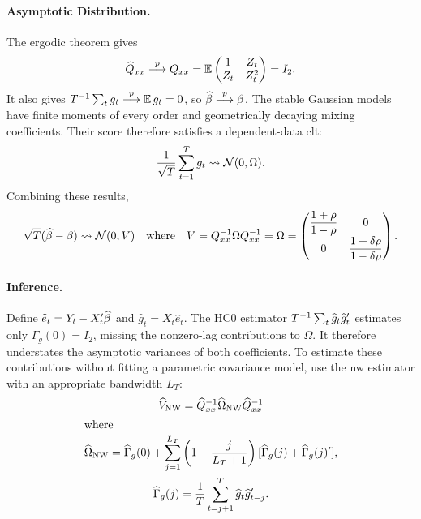\documentclass[a4paper,12pt]{article}
\begin{document}
\paragraph{Asymptotic Distribution.}
The ergodic theorem gives
\begin{align}
	\widehat Q_{xx}\overset{p}{\longrightarrow} Q_{xx}
	=\operatorname{\mathbb{E}}\begin{pmatrix}1&Z_t\\Z_t&Z_t^2\end{pmatrix}=I_2.
\end{align}
It also gives $T^{-1}\sum_tg_t\overset{p}{\longrightarrow}\operatorname{\mathbb{E}} g_t=0$, so $\widehat\beta\overset{p}{\longrightarrow}\beta$.
The stable Gaussian models have finite moments of every order and geometrically decaying mixing coefficients.
Their score therefore satisfies a dependent-data \gls{clt}:
\begin{align}
	\frac1{\sqrt T}\sum_{t=1}^T g_t\overset{}{\leadsto}\operatorname{\mathcal{N}}(0,\Omega).
\end{align}
Combining these results,
\begin{gather}
	\sqrt T(\widehat\beta-\beta)
	\overset{}{\leadsto}\operatorname{\mathcal{N}}(0,V)
	\quad\text{where}\quad
	V=Q_{xx}^{-1}\Omega Q_{xx}^{-1}=\Omega
	=\begin{pmatrix}
		\dfrac{1+\rho}{1-\rho}&0\\[6pt]
		0&\dfrac{1+\delta\rho}{1-\delta\rho}
	\end{pmatrix}.
\end{gather}

\paragraph{Inference.}
Define $\widehat e_t=Y_t-X_t^{\prime}\widehat\beta$ and $\widehat g_t=X_t\widehat e_t$.
The HC0 estimator $T^{-1}\sum_t\widehat g_t\widehat g_t^{\prime}$ estimates only $\Gamma_g(0)=I_2$,
missing the nonzero-lag contributions to $\Omega$.
It therefore understates the asymptotic variances of both coefficients.
To estimate these contributions without fitting a parametric covariance model,
use the \gls{nw} estimator with an appropriate bandwidth $L_T$:
\begin{gather}
	\widehat V_{\mathrm{NW}}=\widehat Q_{xx}^{-1}\widehat\Omega_{\mathrm{NW}}\widehat Q_{xx}^{-1}\\
	\shortintertext{where}
	\widehat\Omega_{\mathrm{NW}}
	=\widehat\Gamma_g(0)+\sum_{j=1}^{L_T}\left(1-\frac{j}{L_T+1}\right)
	[\widehat\Gamma_g(j)+\widehat\Gamma_g(j)^{\prime}],\\
	\widehat\Gamma_g(j)=\frac1T\sum_{t=j+1}^T\widehat g_t\widehat g_{t-j}^{\prime}.
\end{gather}
\end{document}
